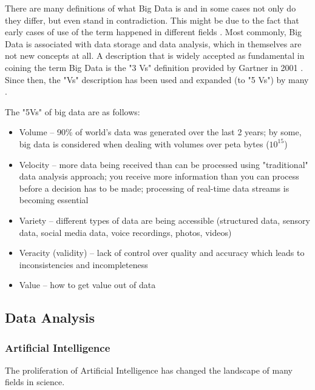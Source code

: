 There are many definitions of what Big Data is and in some cases not only do they differ, but even stand in contradiction. This might be due to the fact that early cases of use of the term happened in different fields \citep{demchenko2014defining, Ward2013}. Most commonly, Big Data is associated with data storage and data analysis, which in themselves are not new concepts at all. A description that is widely accepted as fundamental in coining the term Big Data is the "3 Vs" definition provided by Gartner in 2001 \citep{douglas20013d, Ward2013}. Since then, the "Vs" description has been used and expanded (to "5 Vs") by many \citep{McAfee2012, minelli2012big, demchenko2014defining, NIST2015}.

The "5Vs" of big data are as follows:
\begin{itemize}
\item Volume – 90\% of world's data was generated over the last 2 years; by some, big data is considered when dealing with volumes over peta bytes ($10^{15}$)

\item Velocity – more data being received than can be processed using "traditional" data analysis approach; you receive more information than you can process before a decision has to be made; processing of real-time data streams is becoming essential

\item Variety – different types of data are being accessible (structured data, sensory data, social media data, voice recordings, photos, videos)

\item Veracity (validity) – lack of control over quality and accuracy which leads to inconsistencies and incompleteness

\item Value – how to get value out of data
\end{itemize}

		\subsection{Data Analysis}
		
			\subsubsection{Artificial Intelligence}
			
The proliferation of Artificial Intelligence has changed the landscape of many fields in science. 

